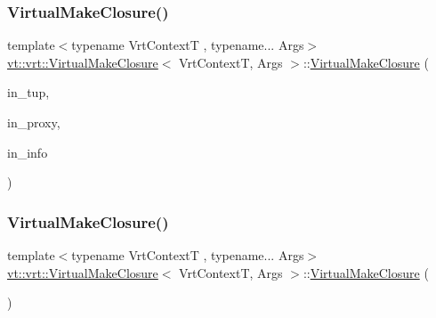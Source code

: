 \subsubsection{\texorpdfstring{Virtual\+Make\+Closure()}{VirtualMakeClosure()}\hspace{0.1cm}{\footnotesize\ttfamily [1/2]}}
{\footnotesize\ttfamily template$<$typename Vrt\+ContextT , typename... Args$>$ \\
\hyperlink{structvt_1_1vrt_1_1_virtual_make_closure}{vt\+::vrt\+::\+Virtual\+Make\+Closure}$<$ Vrt\+ContextT, Args $>$\+::\hyperlink{structvt_1_1vrt_1_1_virtual_make_closure}{Virtual\+Make\+Closure} (\begin{DoxyParamCaption}\item[{\hyperlink{structvt_1_1vrt_1_1_virtual_make_closure_a19b5a051873fa150d9e8ef778fa8afb2}{Tuple\+Type} \&\&}]{in\+\_\+tup,  }\item[{\hyperlink{namespacevt_a1b417dd5d684f045bb58a0ede70045ac}{Virtual\+Proxy\+Type} const \&}]{in\+\_\+proxy,  }\item[{\hyperlink{structvt_1_1vrt_1_1_virtual_info}{Virtual\+Info} $\ast$}]{in\+\_\+info }\end{DoxyParamCaption})\hspace{0.3cm}{\ttfamily [inline]}}

\mbox{\label{structvt_1_1vrt_1_1_virtual_make_closure_a04ecd116e579c40931845d0bd218ebce}} 
\subsubsection{\texorpdfstring{Virtual\+Make\+Closure()}{VirtualMakeClosure()}\hspace{0.1cm}{\footnotesize\ttfamily [2/2]}}
{\footnotesize\ttfamily template$<$typename Vrt\+ContextT , typename... Args$>$ \\
\hyperlink{structvt_1_1vrt_1_1_virtual_make_closure}{vt\+::vrt\+::\+Virtual\+Make\+Closure}$<$ Vrt\+ContextT, Args $>$\+::\hyperlink{structvt_1_1vrt_1_1_virtual_make_closure}{Virtual\+Make\+Closure} (\begin{DoxyParamCaption}\item[{\hyperlink{structvt_1_1vrt_1_1_virtual_make_closure}{Virtual\+Make\+Closure}$<$ Vrt\+ContextT, Args $>$ \&\&}]{ }\end{DoxyParamCaption})\hspace{0.3cm}{\ttfamily [default]}}



